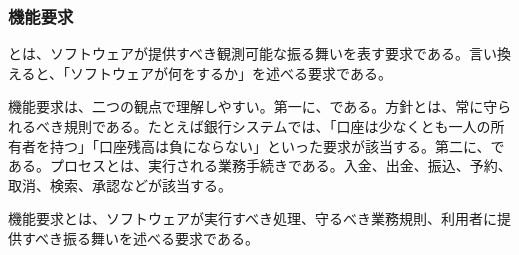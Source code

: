 \subsubsection{機能要求}

とは、ソフトウェアが提供すべき観測可能な振る舞いを表す要求である。言い換えると、「ソフトウェアが何をするか」を述べる要求である。

機能要求は、二つの観点で理解しやすい。第一に、である。方針とは、常に守られるべき規則である。たとえば銀行システムでは、「口座は少なくとも一人の所有者を持つ」「口座残高は負にならない」といった要求が該当する。第二に、である。プロセスとは、実行される業務手続きである。入金、出金、振込、予約、取消、検索、承認などが該当する。

\begin{definitionbox}機能要求とは、ソフトウェアが実行すべき処理、守るべき業務規則、利用者に提供すべき振る舞いを述べる要求である。\end{definitionbox}
